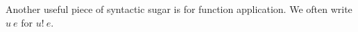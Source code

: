 \documentclass[preprint]{sigplanconf}
\newcommand{\lameff}{$\lambda_\mathrm{eff}$\xspace}
\newcommand{\feff}{$F_\textrm{eff}$\xspace}
\newcommand{\impeff}{Implicit \lameff}
\newcommand{\force}[1]{{#1}!}
\begin{document}
Another useful piece of syntactic sugar is for function
application. We often write $u~e$ for $\force{u}~e$.

















\end{document}
